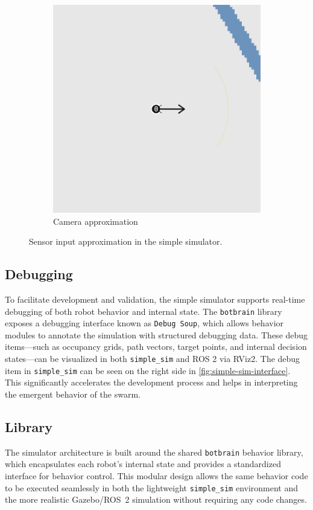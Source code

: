 \begin{figure}
\begin{subfigure}[b]{0.45\textwidth}
        \includegraphics[width=\textwidth]{figures/screenshots/simple-camera.png}
        \caption{Camera approximation}
        \label{fig:camera-approximation}
    \end{subfigure}
    \caption{Sensor input approximation in the simple simulator.}
    \label{fig:sensor-approximation}
\end{figure}

\subsection{Debugging}
To facilitate development and validation, the simple simulator supports real-time debugging of both robot behavior and internal state. The \texttt{botbrain} library exposes a debugging interface known as \texttt{Debug Soup}, which allows behavior modules to annotate the simulation with structured debugging data. These debug items—such as occupancy grids, path vectors, target points, and internal decision states—can be visualized in both \texttt{simple\_sim} and ROS 2 via RViz2. The debug item in \texttt{simple\_sim} can be seen on the right side in \cref{fig:simple-sim-interface}.
This significantly accelerates the development process and helps in interpreting the emergent behavior of the swarm.

\subsection{Library}
The simulator architecture is built around the shared \texttt{botbrain} behavior library, which encapsulates each robot’s internal state and provides a standardized interface for behavior control. This modular design allows the same behavior code to be executed seamlessly in both the lightweight \texttt{simple\_sim} environment and the more realistic Gazebo/ROS~2 simulation without requiring any code changes.

